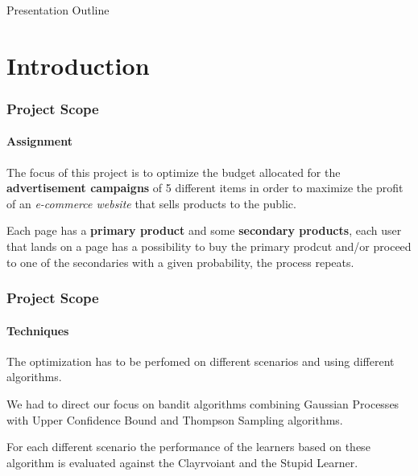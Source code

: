\documentclass[11pt]{beamer}
\begin{document}
\frame{\titlepage}

\begin{frame}{Presentation Outline}
\begin{tiny}
    \tableofcontents[hideallsubsections]
\end{tiny}
\end{frame}


\AtBeginSection[]
{
\begin{frame}{}
    \tableofcontents[sections={\thesection}]
\end{frame}
}


\section{Introduction}


\begin{frame}

\frametitle{Project Scope}
\framesubtitle{Assignment}

The focus of this project is to optimize the budget allocated for the \textbf{advertisement campaigns} of 5 different items in order to maximize the profit of an \textit{e-commerce website} that sells products to the public.

Each page has a \textbf{primary product} and some \textbf{secondary products}, each user that lands on a page has a possibility to buy the primary prodcut and/or proceed to one of the secondaries with a given probability, the process repeats.

\end{frame}



\begin{frame}

\frametitle{Project Scope}
\framesubtitle{Techniques}

The optimization has to be perfomed on different scenarios and using different algorithms.

We had to direct our focus on bandit algorithms combining Gaussian Processes with Upper Confidence Bound and Thompson Sampling algorithms.

For each different scenario the performance of the learners based on these algorithm is evaluated against the Clayrvoiant and the Stupid Learner.

\end{frame}
\end{document}
